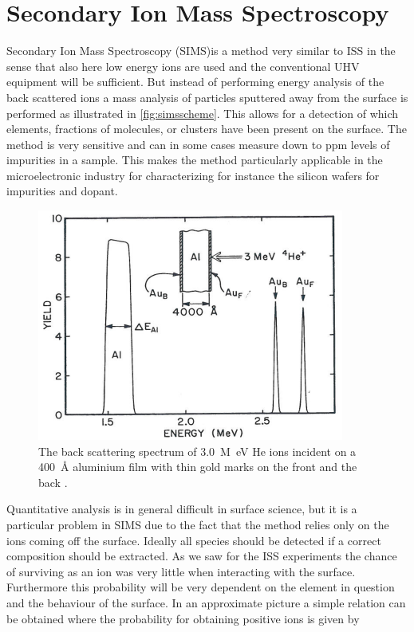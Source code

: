 \section{Secondary Ion Mass Spectroscopy}
Secondary Ion Mass Spectroscopy (SIMS)is a method very similar to ISS in the sense that also here low energy ions are used and the conventional UHV equipment will be sufficient. But instead of performing energy analysis of the back scattered ions a mass analysis of particles sputtered away from the surface is performed as illustrated in \autoref{fig:simsscheme}. This allows for a detection of which elements, fractions of molecules, or clusters have been present on the surface. The method is very sensitive and can in some cases measure down to ppm levels of impurities in a sample. This makes the method particularly applicable in the microelectronic industry for characterizing for instance the silicon wafers for impurities and dopant.

\begin{figure}[h!]
	\begin{center}
	\includegraphics[scale=4]{figures/11_05.png}
	\caption{The back scattering spectrum of \SI{3.0}{M\electronvolt} He ions incident on a \SI{400}{\angstrom} aluminium film with thin gold marks on the front and the back \cite{feldman}.}
	\label{fig:alaubackscatter}
	\end{center}
\end{figure}

Quantitative analysis is in general difficult in surface science, but it is a particular problem in SIMS due to the fact that the method relies only on the ions coming off the surface. Ideally all species should be detected if a correct composition should be extracted. As we saw for the ISS experiments the chance of surviving as an ion was very little when interacting with the surface. Furthermore this probability will be very dependent on the element in question and the behaviour of the surface. In an approximate picture a simple relation can be obtained \cite{Norskovlang} where the probability for obtaining positive ions is given by

